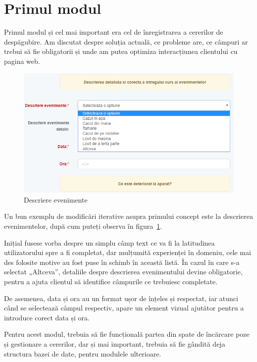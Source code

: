 \section{Primul modul}

	Primul modul și cel mai important era cel de înregistrarea a cererilor de despăgubire.
	Am discutat despre soluția actuală, ce probleme are, ce câmpuri ar trebui să fie obligatorii și unde am putea optimiza interacțiunea clientului cu pagina web.

	\begin{figure}
		\includegraphics[width=\linewidth]{../imagini/descriere_eveniment.png}
		\caption{Descriere evenimente}
		\label{fig:descriere_evenimente}
	\end{figure}

	Un bun exemplu de modificări iterative asupra primului concept este la descrierea evenimentelor, după cum puteți observa în figura~\ref{fig:descriere_evenimente}.

	Inițial fusese vorba despre un simplu câmp text ce va fi la latitudinea utilizatorului spre a fi completat, dar mulțumită experienței în domeniu, cele mai des folosite motive au fost puse în schimb în această listă.
	În cazul în care s-a selectat „Altceva”, detaliile despre descrierea evenimentului devine obligatorie, pentru a ajuta clientul să identifice câmpurile ce trebuiesc completate.

	De asemenea, data și ora au un format ușor de înțeles și respectat, iar atunci când se selectează câmpul respectiv, apare un element vizual ajutător pentru a introduce corect data și ora.

	Pentru acest modul, trebuia să fie funcțională partea din spate de încărcare poze și gestionare a cererilor, dar și mai important, trebuia să fie gândită deja structura bazei de date, pentru modulele ulterioare.

